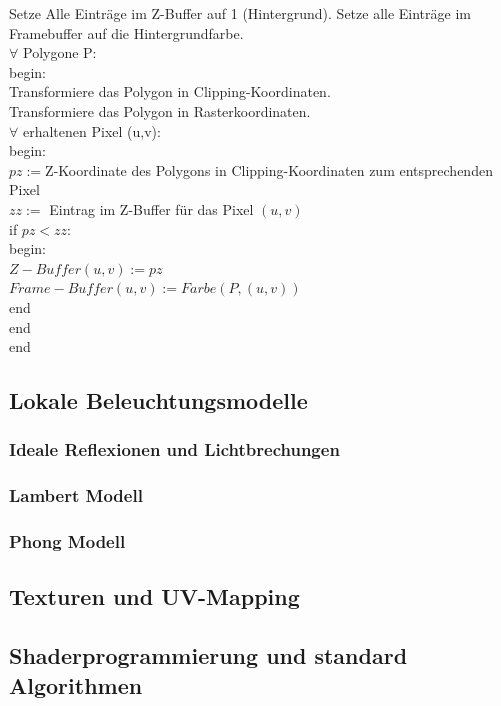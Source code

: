 \begin{Algorithmus}
Setze Alle Einträge im Z-Buffer auf 1 (Hintergrund).
Setze alle Einträge im Framebuffer auf die Hintergrundfarbe. \\
$\forall$ Polygone P: \\
begin: \\
Transformiere das Polygon in Clipping-Koordinaten. \\
Transformiere das Polygon in Rasterkoordinaten. \\
$\forall$ erhaltenen Pixel (u,v): \\
begin: \\
$pz := $Z-Koordinate des Polygons in Clipping-Koordinaten zum entsprechenden Pixel \\
$zz:=$ Eintrag im Z-Buffer für das Pixel $(u,v)$ \\
if $pz < zz$: \\
begin: \\
$Z-Buffer(u,v) := pz$ \\
$Frame-Buffer(u,v) := Farbe(P,(u,v))$ \\
end \\
end \\
end

\end{Algorithmus}





\subsection{Lokale Beleuchtungsmodelle}
\subsubsection{Ideale Reflexionen und Lichtbrechungen}
\subsubsection{Lambert  Modell}
\subsubsection{Phong Modell}

\subsection{Texturen und UV-Mapping}
\subsection{Shaderprogrammierung und standard Algorithmen}

